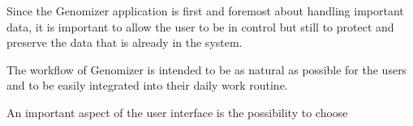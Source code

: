 Since the Genomizer application is first and foremost about handling important 
data, it is important to allow the user to be in control but still to protect 
and preserve the data that is already in the system.

The workflow of Genomizer is intended to be as natural as possible for 
the users and to be easily integrated into their daily work routine.

An important aspect of the user interface is the possibility to choose

